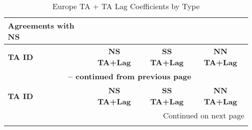 \begin{center}
\small
\begin{longtable}{lccc}
    \caption{Europe TA + TA Lag Coefficients by Type} \label{tab:europe_pta} \\

    \hline
    \textbf{Agreements with NS} &  &  &  \\
    \hline
    \textbf{TA ID} & \textbf{NS TA+Lag} & \textbf{SS TA+Lag} & \textbf{NN TA+Lag} \\
    \hline
    \endfirsthead
    
    \multicolumn{4}{c}{{\bfseries \tablename\ \thetable{} -- continued from previous page}} \\
    \hline
    \textbf{TA ID} & \textbf{NS TA+Lag} & \textbf{SS TA+Lag} & \textbf{NN TA+Lag} \\
    \hline
    \endhead
    
    \hline \multicolumn{4}{r}{{Continued on next page}} \\ \hline
    \endfoot
    
    \hline
    \endlastfoot
    

\end{longtable}
\end{center}
